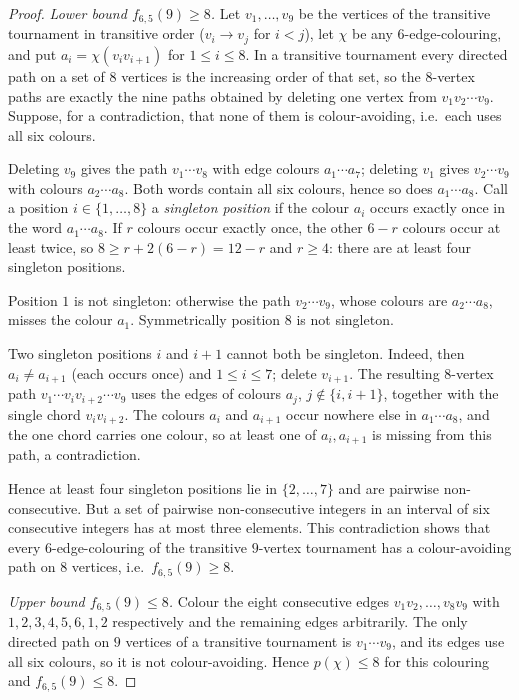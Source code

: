 \documentclass[11pt,a4paper]{article}
\theoremstyle{plain}
\theoremstyle{definition}
\theoremstyle{remark}
\newcommand{\col}{\chi}
\newcommand{\pth}{p}
\begin{document}
\label{pf:benchmark}
\lembench*
\begin{proof}
\emph{Lower bound $f_{6,5}(9)\ge8$.} Let $v_1,\dots,v_9$ be the vertices of the transitive tournament in transitive order ($v_i\to v_j$ for $i<j$), let $\col$ be any $6$-edge-colouring, and put $a_i=\col(v_iv_{i+1})$ for $1\le i\le8$. In a transitive tournament every directed path on a set of $8$ vertices is the increasing order of that set, so the $8$-vertex paths are exactly the nine paths obtained by deleting one vertex from $v_1v_2\cdots v_9$. Suppose, for a contradiction, that none of them is colour-avoiding, i.e.\ each uses all six colours.

Deleting $v_9$ gives the path $v_1\cdots v_8$ with edge colours $a_1\cdots a_7$; deleting $v_1$ gives $v_2\cdots v_9$ with colours $a_2\cdots a_8$. Both words contain all six colours, hence so does $a_1\cdots a_8$. Call a position $i\in\{1,\dots,8\}$ a \emph{singleton position} if the colour $a_i$ occurs exactly once in the word $a_1\cdots a_8$. If $r$ colours occur exactly once, the other $6-r$ colours occur at least twice, so $8\ge r+2(6-r)=12-r$ and $r\ge4$: there are at least four singleton positions.

Position $1$ is not singleton: otherwise the path $v_2\cdots v_9$, whose colours are $a_2\cdots a_8$, misses the colour $a_1$. Symmetrically position $8$ is not singleton.

Two singleton positions $i$ and $i+1$ cannot both be singleton. Indeed, then $a_i\ne a_{i+1}$ (each occurs once) and $1\le i\le7$; delete $v_{i+1}$. The resulting $8$-vertex path $v_1\cdots v_iv_{i+2}\cdots v_9$ uses the edges of colours $a_j$, $j\notin\{i,i+1\}$, together with the single chord $v_iv_{i+2}$. The colours $a_i$ and $a_{i+1}$ occur nowhere else in $a_1\cdots a_8$, and the one chord carries one colour, so at least one of $a_i,a_{i+1}$ is missing from this path, a contradiction.

Hence at least four singleton positions lie in $\{2,\dots,7\}$ and are pairwise non-consecutive. But a set of pairwise non-consecutive integers in an interval of six consecutive integers has at most three elements. This contradiction shows that every $6$-edge-colouring of the transitive $9$-vertex tournament has a colour-avoiding path on $8$ vertices, i.e.\ $f_{6,5}(9)\ge8$.

\emph{Upper bound $f_{6,5}(9)\le8$.} Colour the eight consecutive edges $v_1v_2,\dots,v_8v_9$ with $1,2,3,4,5,6,1,2$ respectively and the remaining edges arbitrarily. The only directed path on $9$ vertices of a transitive tournament is $v_1\cdots v_9$, and its edges use all six colours, so it is not colour-avoiding. Hence $\pth(\col)\le8$ for this colouring and $f_{6,5}(9)\le8$.
\end{proof}
\end{document}
